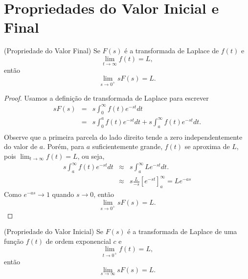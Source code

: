 \section{Propriedades do Valor Inicial e Final}
\begin{teo}(Propriedade do Valor Final) Se $F(s)$ é a transformada de Laplace de $f(t)$ e 
\begin{equation}
\lim_{t\to\infty}f(t)=L,
\end{equation}
então
\begin{equation}
\lim_{s\to 0^+} sF(s)=L.
\end{equation}
\end{teo}
\begin{proof}Usamos a definição de transformada de Laplace para escrever
\begin{eqnarray*}
sF(s)&=&s\int_0^\infty f(t)e^{-st}dt\\
&=&s\int_0^a f(t)e^{-st}dt+s\int_a^\infty f(t)e^{-st}dt.\\
\end{eqnarray*}
Observe que a primeira parcela do lado direito tende a zero independentemente do valor de $a$. Porém, para $a$ suficientemente grande, $f(t)$ se aproxima de $L$, pois $\displaystyle \lim_{t\to\infty}f(t)=L$, ou seja,
\begin{eqnarray*}
s\int_a^\infty f(t)e^{-st}dt &\approx &s\int_a^\infty L e^{-st}dt.\\
&\approx &s\frac{L}{-s}\left[ e^{-st}\right]_a^\infty=Le^{-as}
\end{eqnarray*}
Como $e^{-as}\to 1$ quando $s\to 0$, então
\begin{equation}
\lim_{s\to 0^+} sF(s)=L.
\end{equation} 
\end{proof}
\begin{teo}(Propriedade do Valor Inicial) Se $F(s)$ é a transformada de Laplace de uma função $f(t)$ de ordem exponencial $c$ e 
\begin{equation}
\lim_{t\to 0^+}f(t)=L,
\end{equation}
então
\begin{equation}
\lim_{s\to \infty} sF(s)=L.
\end{equation}
\end{teo}
